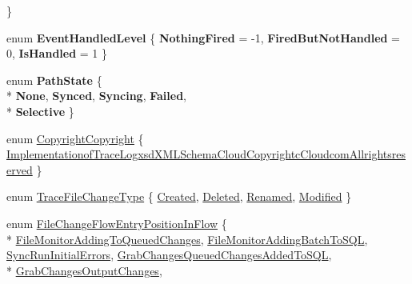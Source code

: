 \begin{DoxyCompactItemize}
 \}
\item 
enum {\bfseries Event\-Handled\-Level} \{ {\bfseries Nothing\-Fired} = -\/1, 
{\bfseries Fired\-But\-Not\-Handled} = 0, 
{\bfseries Is\-Handled} = 1
 \}
\item 
enum {\bfseries Path\-State} \{ \\*
{\bfseries None}, 
{\bfseries Synced}, 
{\bfseries Syncing}, 
{\bfseries Failed}, 
\\*
{\bfseries Selective}
 \}
\item 
enum \hyperlink{namespace_cloud_api_public_1_1_static_a889ed6895b377efd7091a65ddb8cb3f0}{Copyright\-Copyright} \{ \hyperlink{namespace_cloud_api_public_1_1_static_a889ed6895b377efd7091a65ddb8cb3f0}{Implementationof\-Trace\-Logxsd\-X\-M\-L\-Schema\-Cloud\-Copyrightc\-Cloudcom\-Allrightsreserved}
 \}
\begin{DoxyCompactList}\small\item\em \end{DoxyCompactList}\item 
enum \hyperlink{namespace_cloud_api_public_1_1_static_aadccab0d764f187bdd87a34e98676034}{Trace\-File\-Change\-Type} \{ \hyperlink{namespace_cloud_api_public_1_1_static_aadccab0d764f187bdd87a34e98676034}{Created}, 
\hyperlink{namespace_cloud_api_public_1_1_static_aadccab0d764f187bdd87a34e98676034}{Deleted}, 
\hyperlink{namespace_cloud_api_public_1_1_static_aadccab0d764f187bdd87a34e98676034}{Renamed}, 
\hyperlink{namespace_cloud_api_public_1_1_static_aadccab0d764f187bdd87a34e98676034}{Modified}
 \}
\begin{DoxyCompactList}\small\item\em \end{DoxyCompactList}\item 
enum \hyperlink{namespace_cloud_api_public_1_1_static_a9082ca8fb56ff22723a53cd835e02451}{File\-Change\-Flow\-Entry\-Position\-In\-Flow} \{ \\*
\hyperlink{namespace_cloud_api_public_1_1_static_a9082ca8fb56ff22723a53cd835e02451}{File\-Monitor\-Adding\-To\-Queued\-Changes}, 
\hyperlink{namespace_cloud_api_public_1_1_static_a9082ca8fb56ff22723a53cd835e02451}{File\-Monitor\-Adding\-Batch\-To\-S\-Q\-L}, 
\hyperlink{namespace_cloud_api_public_1_1_static_a9082ca8fb56ff22723a53cd835e02451}{Sync\-Run\-Initial\-Errors}, 
\hyperlink{namespace_cloud_api_public_1_1_static_a9082ca8fb56ff22723a53cd835e02451}{Grab\-Changes\-Queued\-Changes\-Added\-To\-S\-Q\-L}, 
\\*
\hyperlink{namespace_cloud_api_public_1_1_static_a9082ca8fb56ff22723a53cd835e02451}{Grab\-Changes\-Output\-Changes}, 

\end{DoxyCompactItemize}
